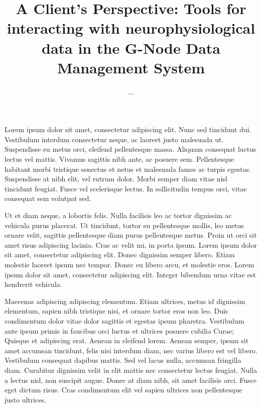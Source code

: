 \documentclass[a4paper]{article}
\begin{document}
\title{A Client's Perspective: Tools for interacting with
  neurophysiological data in the G-Node Data Management System}
\author{...} %

\maketitle

Lorem ipsum dolor sit amet, consectetur adipiscing elit. Nunc sed
tincidunt dui. Vestibulum interdum consectetur neque, ac laoreet justo
malesuada ut. Suspendisse eu metus orci, eleifend pellentesque
massa. Aliquam consequat luctus lectus vel mattis. Vivamus sagittis
nibh ante, ac posuere sem. Pellentesque habitant morbi tristique
senectus et netus et malesuada fames ac turpis egestas. Suspendisse at
nibh elit, vel rutrum dolor. Morbi semper diam vitae nisl tincidunt
feugiat. Fusce vel scelerisque lectus. In sollicitudin tempus orci,
vitae consequat sem volutpat sed.

Ut et diam neque, a lobortis felis. Nulla facilisis leo ac tortor
dignissim ac vehicula purus placerat. Ut tincidunt, tortor eu
pellentesque mollis, leo metus ornare velit, sagittis pellentesque
diam purus pellentesque metus. Proin ut orci sit amet risus adipiscing
lacinia. Cras ac velit mi, in porta ipsum. Lorem ipsum dolor sit amet,
consectetur adipiscing elit. Donec dignissim semper libero. Etiam
molestie laoreet ipsum nec tempor. Donec eu libero arcu, et molestie
eros. Lorem ipsum dolor sit amet, consectetur adipiscing elit. Integer
bibendum urna vitae est hendrerit vehicula.

Maecenas adipiscing adipiscing elementum. Etiam ultrices, metus id
dignissim elementum, sapien nibh tristique nisi, et ornare tortor eros
non leo. Duis condimentum dolor vitae dolor sagittis et egestas ipsum
pharetra. Vestibulum ante ipsum primis in faucibus orci luctus et
ultrices posuere cubilia Curae; Quisque et adipiscing erat. Aenean in
eleifend lorem. Aenean semper, ipsum sit amet accumsan tincidunt,
felis nisi interdum diam, nec varius libero est vel libero. Vestibulum
consequat dapibus mattis. Sed vel lacus nulla, accumsan fringilla
diam. Curabitur dignissim velit in elit mattis nec consectetur lectus
feugiat. Nulla a lectus nisl, non suscipit augue. Donec at diam nibh,
sit amet facilisis orci. Fusce eget dictum risus. Cras condimentum
elit vel sapien ultrices non pellentesque justo ultrices.
\end{document}
